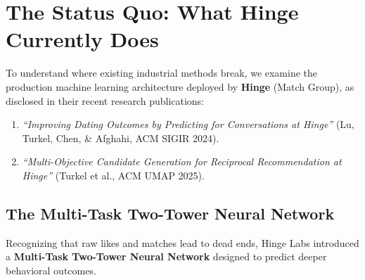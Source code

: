 \documentclass[11pt,letterpaper]{article}
\theoremstyle{definition}
\theoremstyle{plain}
\theoremstyle{remark}
\begin{document}
\newpage
\section{The Status Quo: What Hinge Currently Does}
\label{sec:hinge}

To understand where existing industrial methods break, we examine the production machine learning architecture deployed by \textbf{Hinge} (Match Group), as disclosed in their recent research publications:
\begin{enumerate}
    \item \emph{``Improving Dating Outcomes by Predicting for Conversations at Hinge''} (Lu, Turkel, Chen, \& Afghahi, ACM SIGIR 2024).
    \item \emph{``Multi-Objective Candidate Generation for Reciprocal Recommendation at Hinge''} (Turkel et al., ACM UMAP 2025).
\end{enumerate}

\subsection{The Multi-Task Two-Tower Neural Network}
Recognizing that raw likes and matches lead to dead ends, Hinge Labs introduced a \textbf{Multi-Task Two-Tower Neural Network} designed to predict deeper behavioral outcomes. 
\end{document}
